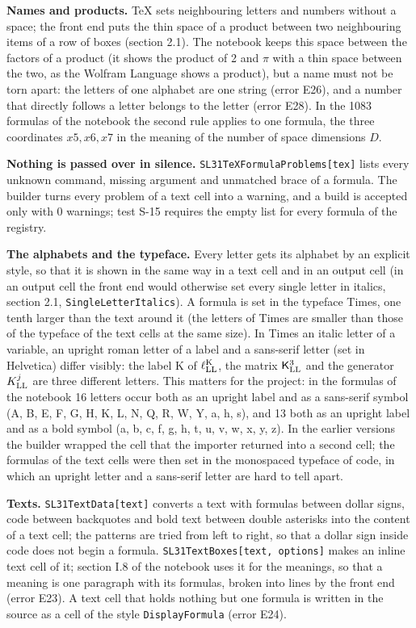 \documentclass[
  10pt,
]{article}
\begin{document}
\textbf{Names and products.} TeX sets neighbouring letters and numbers
without a space; the front end puts the thin space of a product between
two neighbouring items of a row of boxes (section 2.1). The notebook
keeps this space between the factors of a product (it shows the product
of 2 and \(\pi\) with a thin space between the two, as the Wolfram
Language shows a product), but a name must not be torn apart: the
letters of one alphabet are one string (error E26), and a number that
directly follows a letter belongs to the letter (error E28). In the 1083
formulas of the notebook the second rule applies to one formula, the
three coordinates \(x5,x6,x7\) in the meaning of the number of space
dimensions \(D\).

\textbf{Nothing is passed over in silence.}
\texttt{SL31TeXFormulaProblems{[}tex{]}} lists every unknown command,
missing argument and unmatched brace of a formula. The builder turns
every problem of a text cell into a warning, and a build is accepted
only with 0 warnings; test S-15 requires the empty list for every
formula of the registry.

\textbf{The alphabets and the typeface.} Every letter gets its alphabet
by an explicit style, so that it is shown in the same way in a text cell
and in an output cell (in an output cell the front end would otherwise
set every single letter in italics, section 2.1,
\texttt{SingleLetterItalics}). A formula is set in the typeface Times,
one tenth larger than the text around it (the letters of Times are
smaller than those of the typeface of the text cells at the same size).
In Times an italic letter of a variable, an upright roman letter of a
label and a sans-serif letter (set in Helvetica) differ visibly: the
label K of \(\ell^{\rm K}_{\rm LL}\), the matrix
\(\mathsf K^3_{\rm LL}\) and the generator \(K^j_{\rm LL}\) are three
different letters. This matters for the project: in the formulas of the
notebook 16 letters occur both as an upright label and as a sans-serif
symbol (A, B, E, F, G, H, K, L, N, Q, R, W, Y, a, h, s), and 13 both as
an upright label and as a bold symbol (a, b, c, f, g, h, t, u, v, w, x,
y, z). In the earlier versions the builder wrapped the cell that the
importer returned into a second cell; the formulas of the text cells
were then set in the monospaced typeface of code, in which an upright
letter and a sans-serif letter are hard to tell apart.

\textbf{Texts.} \texttt{SL31TextData{[}text{]}} converts a text with
formulas between dollar signs, code between backquotes and bold text
between double asterisks into the content of a text cell; the patterns
are tried from left to right, so that a dollar sign inside code does not
begin a formula. \texttt{SL31TextBoxes{[}text,\ options{]}} makes an
inline text cell of it; section I.8 of the notebook uses it for the
meanings, so that a meaning is one paragraph with its formulas, broken
into lines by the front end (error E23). A text cell that holds nothing
but one formula is written in the source as a cell of the style
\texttt{DisplayFormula} (error E24).
\end{document}
